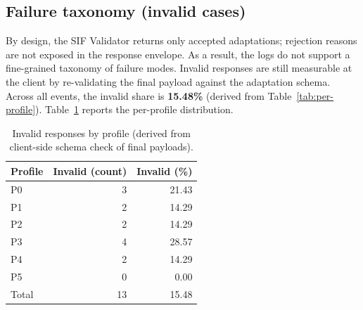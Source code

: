 \documentclass[openany]{book}
\begin{document}



\subsection{Failure taxonomy (invalid cases)}
\label{sec:failures}
By design, the SIF Validator returns only accepted adaptations; rejection reasons are not exposed in the response envelope. As a result, the logs do not support a fine-grained taxonomy of failure modes. Invalid responses are still measurable at the client by re-validating the final payload against the adaptation schema. Across all events, the invalid share is \textbf{15.48\%} (derived from Table~\ref{tab:per-profile}). Table~\ref{tab:invalid-by-profile} reports the per-profile distribution.

\begin{table}[H]
\centering
\caption{Invalid responses by profile (derived from client-side schema check of final payloads).}
\label{tab:invalid-by-profile}
\begin{tabular}{lrr}
\toprule
\textbf{Profile} & \textbf{Invalid (count)} & \textbf{Invalid (\%)} \\
\midrule
P0 & 3 & 21.43 \\
P1 & 2 & 14.29 \\
P2 & 2 & 14.29 \\
P3 & 4 & 28.57 \\
P4 & 2 & 14.29 \\
P5 & 0 & 0.00 \\
\midrule
Total & 13 & 15.48 \\
\bottomrule
\end{tabular}
\end{table}
\end{document}
